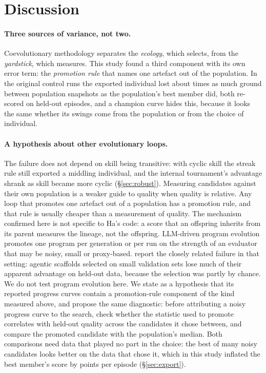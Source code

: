 \documentclass[11pt]{article}
\begin{document}
\section{Discussion}
\label{sec:discussion}

\paragraph{Three sources of variance, not two.}
Coevolutionary methodology separates the \emph{ecology}, which selects, from
the \emph{yardstick}, which measures. This study found a third component with
its own error term: the \emph{promotion rule} that names one artefact out of
the population. In the original control runs the exported individual lost
about \nPhDeclRatio{} times as much ground between population snapshots as the
population's best member did, both re-scored on held-out episodes, and a
champion curve hides this, because it looks the same whether its swings come
from the population or from the choice of individual.

\paragraph{A hypothesis about other evolutionary loops.}
The failure does not depend on skill being transitive: with cyclic skill
the streak rule still exported a middling individual, and the internal
tournament's advantage shrank as skill became more cyclic
(\S\ref{sec:robust}). Measuring candidates against their own population is a
weaker guide to quality when quality is relative.
Any loop that promotes one artefact out of a population has a promotion rule,
and that rule is usually cheaper than a measurement of quality. The mechanism
confirmed here is not specific to Ha's code: a score that an offspring inherits
from its parent measures the lineage, not the offspring. LLM-driven
program evolution \citep{novikov2025alphaevolve,lange2025shinkaevolve} promotes
one program per generation or per run on the strength of an evaluator that may
be noisy, small or proxy-based. \citet{gideoni2026simple} report the closely
related failure in that setting: agentic scaffolds selected on small validation
sets lose much of their apparent advantage on held-out data, because the
selection was partly by chance. We do not test program evolution here. We
state as a hypothesis that its reported progress curves contain a
promotion-rule component of the kind measured above, and propose the same
diagnostic: before attributing a noisy progress curve to the search, check
whether the statistic used to promote correlates with held-out quality across
the candidates it chose between, and compare the promoted candidate with the
population's median. Both comparisons need data that played no part in the
choice: the best of many noisy candidates looks better on the data that chose
it, which in this study inflated the best member's score by \nPhInflation{}
points per episode (\S\ref{sec:export}).
\end{document}
